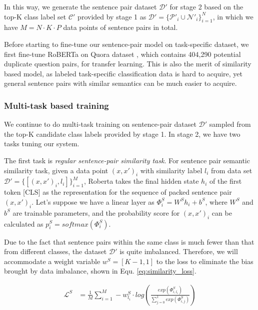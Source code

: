 In  this way, we generate the sentence pair dataset $\mathcal{D'}$ for stage 2
based  on  the  top-K  class  label  set $\mathcal{C'}$ provided by stage 1 as
$\mathcal{D'}=\{\mathcal{P'}_{i}\cup  \mathcal{N'}_{i}\}_{i=1}^{N}$,  in which
we have $M=N\cdot K\cdot P$ data points of sentence pairs in total.

Before starting to fine-tune our sentence-pair model on task-specific dataset,
we  first  fine-tune  RoBERTa on Quora dataset  \cite{iyer2017first}, which
contains  404,290  potential  duplicate question pairs, for transfer learning.
This  is  also  the  merit of similarity based model, as labeled task-specific
classification  data  is  hard  to  acquire,  yet  general sentence pairs with
similar semantics can be much easier to acquire.

\subsubsection*{Multi-task based training}
We   continue  to  do  multi-task  training  on  sentence-pair  dataset
$\mathcal{D'}$ sampled from the top-K candidate class labels provided by stage
1. In stage 2, we have two tasks tuning our system.

The first task is \emph{regular sentence-pair similarity task}.
For  sentence  pair semantic similarity task, given a data point $(x, x')_{i}$
with       similarity       label       $l_{i}$       from       data      set
$\mathcal{D'}=\{[(x,x')_{i},l_{i}]\}_{i=1}^{M}$,   Roberta   takes  the  final
hidden  state  $h_{i}$  of the first token [CLS] as the representation for the
sequence of packed sentence pair $(x, x')_{i}$. Let's suppose we have a linear
layer  as  ${\Phi}^S_{i}=W^Sh_{i}+b^S$,  where  $W^S$  and $b^S$ are trainable
parameters,  and  the probability score for $(x, x')_{i}$ can be calculated as
$p^S_{i}=softmax({\Phi}^S_{i})$.

Due  to  the  fact that sentence pairs within the same class is much fewer than
that from  different  classes,  the  dataset  $\mathcal{D'}$  is
quite imbalanced.  Therefore, we will accommodate a weight variable $w^S = [K-1, 1]$
to  the  loss  to eliminate the bias brought by data imbalance, shown in Equ.
\ref{eq:similarity_loss}.

\begin{equation}
  \begin{aligned}
    \mathcal{L}^{S}&=\frac{1}{M}\sum_{i=1}^{M}-w^S_{l_i}\cdot log(\frac{exp(\varPhi_{i,l_{i}}^S)}{\sum_{j=0}^{1}exp(\varPhi_{i,j}^S)}) \\
    \label{eq:similarity_loss}
  \end{aligned}
\end{equation}

